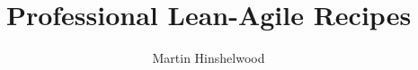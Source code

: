 \usepackage{graphicx}
\usepackage{pdfpages}
\usepackage{fancyhdr}
\pagestyle{fancy}
\usepackage{titlesec}
\newcommand{\sectionbreak}{\clearpage}
\newcommand{\subsubsectionbreak}{\clearpage}
\title{Professional Lean-Agile Recipes}
\author{Martin Hinshelwood}